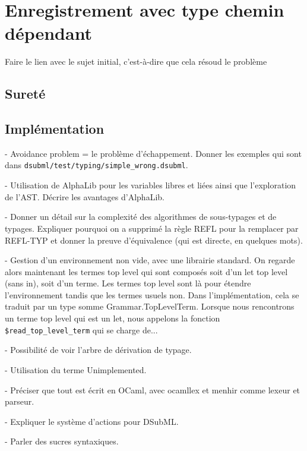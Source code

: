 \chapter{Enregistrement avec type chemin dépendant}

Faire le lien avec le sujet initial, c'est-à-dire que cela résoud le problème 

\section{Sureté}

\section{Implémentation}

- Avoidance problem = le problème d'échappement. Donner les exemples qui sont
dans \verb|dsubml/test/typing/simple_wrong.dsubml|.

- Utilisation de AlphaLib pour les variables libres et liées ainsi que
l'exploration de l'AST. Décrire les avantages d'AlphaLib.

- Donner un détail sur la complexité des algorithmes de sous-typages et de
typages. Expliquer pourquoi on a supprimé la règle REFL pour la remplacer par
REFL-TYP et donner la preuve d'équivalence (qui est directe, en quelques mots).

- Gestion d'un environnement non vide, avec une librairie standard. On regarde
alors maintenant les termes top level qui sont composés soit d'un let top level
(sans in), soit d'un terme. Les termes top level sont là pour étendre
l'environnement tandis que les termes usuels non. Dans l'implémentation, cela se
traduit par un type somme Grammar.TopLevelTerm. Lorsque nous rencontrons un
terme top level qui est un let, nous appelons la fonction \verb|$read_top_level_term|
qui se charge de...

- Possibilité de voir l'arbre de dérivation de typage.

- Utilisation du terme Unimplemented.

- Préciser que tout est écrit en OCaml, avec ocamllex et menhir comme lexeur et parseur.

- Expliquer le système d'actions pour DSubML.

- Parler des sucres syntaxiques.